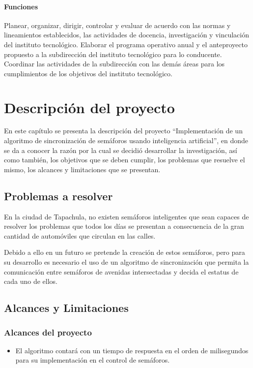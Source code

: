 \subsubsection*{Funciones}

Planear, organizar, dirigir, controlar y evaluar de acuerdo con las normas y lineamientos establecidos, las actividades de docencia, investigación y vinculación del instituto tecnológico. Elaborar el programa operativo anual y el anteproyecto propuesto a la subdirección del instituto tecnológico para lo conducente. Coordinar las actividades de la subdirección con las demás áreas para los cumplimientos de los objetivos del instituto tecnológico.


\chapter{Descripción del proyecto}
En este capítulo se presenta la descripción del proyecto “Implementación de un algoritmo de sincronización de semáforos usando inteligencia artificial”, en donde se da a conocer la razón por la cual se decidió desarrollar la investigación, así como también, los objetivos que se deben cumplir, los problemas que resuelve el mismo, los alcances y limitaciones que se presentan.

\section{Problemas a resolver}
En la ciudad de Tapachula, no existen semáforos inteligentes que sean capaces de resolver los problemas que todos los días se presentan a consecuencia de la gran cantidad de automóviles que circulan en las calles.

Debido a ello en un futuro se pretende la creación de estos semáforos, pero para su desarrollo es necesario el uso de un algoritmo de sincronización que permita la comunicación entre semáforos de avenidas intersectadas y decida el estatus de cada uno de ellos.

\section{Alcances y Limitaciones}
\subsection*{Alcances del proyecto}
\begin{itemize}
\item El algoritmo contará con un tiempo de respuesta en el orden de milisegundos para su implementación en el control de semáforos.
\end{itemize}

